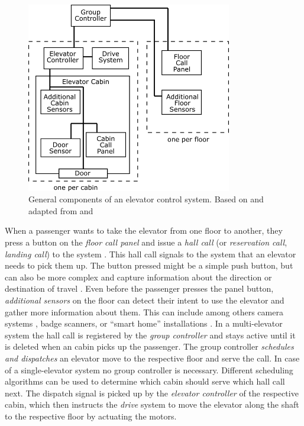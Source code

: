 \begin{figure}[hbt]
	\centering
	\includegraphics[width=0.8\textwidth, keepaspectratio]{resources/systemcomponets}
	\caption{\label{fig:sota:systemcomponents} General components of an elevator control system. Based on and adapted from \textcite[][pp.~4,16]{xang2016trafficlist} and  \textcite[][p.~10]{siikonen1997models}}
\end{figure}

When a passenger wants to take the elevator from one floor to another,
they press a button on the \emph{floor call panel} and issue a \emph{hall call} (or \emph{reservation call}, \emph{landing call}) to the system \autocite[][pp.~6--10]{siikonen1997models}.
This hall call signals to the system that an elevator needs to pick them up.
The button pressed might be a simple push button, but can also be more complex 
and capture information about the direction or destination of travel \autocite[][pp.~89--93]{unger2015aufzuege}.
Even before the passenger presses the panel button, \emph{additional sensors} 
on the floor can detect their intent to use the elevator and gather more information about them.
This can include among others camera systems \autocite[][]{lin2011control}, badge scanners, or \enquote{smart home} installations \autocite[][]{kwon2014sensor}.
In a multi-elevator system the hall call is registered by the \emph{group controller} and stays active until it is deleted when an cabin picks up the passenger.
The group controller \emph{schedules and dispatches} an elevator move to the respective floor and serve the call.
In case of a single-elevator system no group controller is necessary.
Different scheduling algorithms can be used to determine which cabin should serve which hall call next.
The dispatch signal is picked up by the \emph{elevator controller} of the respective cabin, which then instructs the \emph{drive} system to move the elevator along the shaft to the respective floor by actuating the motors.

